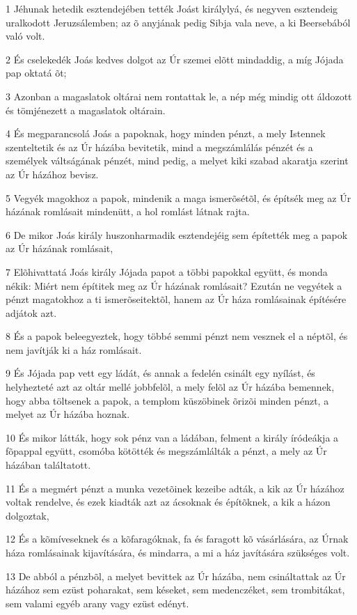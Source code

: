 \par 1 Jéhunak hetedik esztendejében tették Joást királylyá, és negyven esztendeig uralkodott Jeruzsálemben; az õ anyjának pedig Sibja vala neve, a ki Beersebából való volt.
\par 2 És cselekedék Joás kedves dolgot az Úr szemei elõtt mindaddig, a míg Jójada pap oktatá õt;
\par 3 Azonban a magaslatok oltárai nem rontattak le, a nép még mindig ott áldozott és tömjénezett a magaslatok oltárain.
\par 4 És megparancsolá Joás a papoknak, hogy minden pénzt, a mely Istennek szenteltetik és az Úr házába bevitetik, mind a megszámlálás pénzét és a személyek váltságának pénzét, mind pedig, a melyet kiki szabad akaratja szerint az Úr  házához bevisz.
\par 5 Vegyék magokhoz a papok, mindenik a maga ismerõsétõl, és építsék meg az Úr házának romlásait mindenütt, a hol romlást látnak rajta.
\par 6 De mikor Joás király huszonharmadik esztendejéig sem építették meg a papok az Úr házának romlásait,
\par 7 Elõhivattatá Joás király Jójada papot a többi papokkal együtt, és monda nékik: Miért nem építitek meg az Úr házának romlásait? Ezután ne vegyétek a pénzt magatokhoz a ti ismerõseitektõl, hanem az Úr háza romlásainak építésére adjátok azt.
\par 8 És a papok beleegyeztek, hogy többé semmi pénzt nem vesznek el a néptõl, és nem javítják ki a ház romlásait.
\par 9 És Jójada pap vett egy ládát, és annak a fedelén csinált egy nyílást, és helyhezteté azt az oltár mellé jobbfelõl, a mely felõl az Úr házába bemennek, hogy abba töltsenek a papok, a templom küszöbinek õrizõi minden pénzt, a melyet az Úr házába hoznak.
\par 10 És mikor látták, hogy sok pénz van a ládában, felment a király íródeákja a fõpappal együtt, csomóba kötötték és megszámlálták a pénzt, a mely az Úr házában találtatott.
\par 11 És a megmért pénzt a munka vezetõinek kezeibe adták, a kik az Úr házához voltak rendelve, és ezek kiadták azt az ácsoknak és építõknek, a kik a házon dolgoztak,
\par 12 És a kõmíveseknek és a kõfaragóknak, fa és faragott kõ vásárlására, az Úrnak háza romlásainak kijavítására, és mindarra, a mi a ház javítására szükséges volt.
\par 13 De abból a pénzbõl, a melyet bevittek az Úr házába, nem csináltattak az Úr házához sem ezüst poharakat, sem késeket, sem medenczéket, sem trombitákat, sem valami egyéb arany vagy ezüst edényt.
